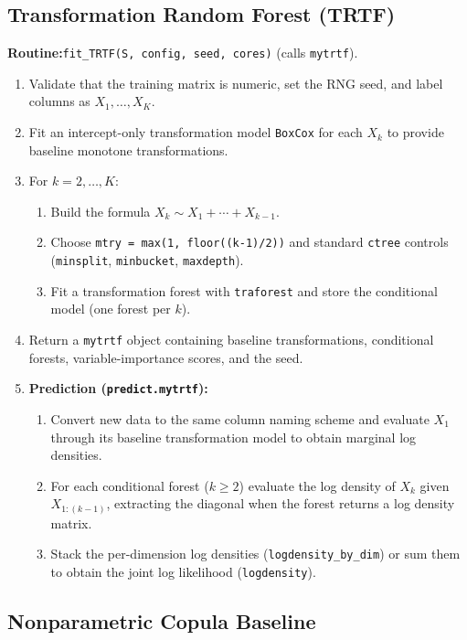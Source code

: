 \documentclass[11pt,a4paper,twoside]{book}\usepackage[]{graphicx}\usepackage[]{xcolor}
\begin{document}
\subsection{Transformation Random Forest (TRTF)}\label{app:trtf}

\textbf{Routine:}\quad\texttt{fit\_TRTF(S, config, seed, cores)} (calls \texttt{mytrtf}).

\begin{enumerate}
 \item Validate that the training matrix is numeric, set the RNG seed, and label columns as $X_1,\ldots,X_K$.
 \item Fit an intercept-only transformation model \texttt{BoxCox} for each $X_k$ to provide baseline monotone transformations.
 \item For $k = 2,\ldots,K$:
 \begin{enumerate}
 \item Build the formula $X_k \sim X_1 + \cdots + X_{k-1}$.
 \item Choose \texttt{mtry = max(1, floor((k-1)/2))} and standard \texttt{ctree} controls (\texttt{minsplit}, \texttt{minbucket}, \texttt{maxdepth}).
 \item Fit a transformation forest with \texttt{traforest} and store the conditional model (one forest per $k$).
 \end{enumerate}
 \item Return a \texttt{mytrtf} object containing baseline transformations, conditional forests, variable-importance scores, and the seed.

 \item \textbf{Prediction (\texttt{predict.mytrtf}):}
 \begin{enumerate}
 \item Convert new data to the same column naming scheme and evaluate $X_1$ through its baseline transformation model to obtain marginal log densities.
 \item For each conditional forest ($k\geq 2$) evaluate the log density of $X_k$ given $X_{1:(k-1)}$, extracting the diagonal when the forest returns a log density matrix.
 \item Stack the per-dimension log densities (\texttt{logdensity\_by\_dim}) or sum them to obtain the joint log likelihood (\texttt{logdensity}).
 \end{enumerate}
\end{enumerate}

\subsection{Nonparametric Copula Baseline}\label{app:copula}
\end{document}
